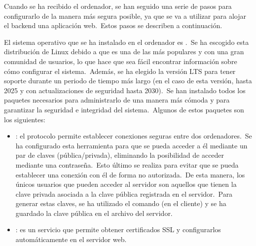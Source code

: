 Cuando se ha recibido el ordenador, se han seguido una serie de pasos para configurarlo de la manera más segura posible,
ya que se va a utilizar para alojar el backend una aplicación web.\ Estos pasos se describen a continuación.

El sistema operativo que se ha instalado en el ordenador es .\ Se ha escogido esta
distribución de Linux debido a que es una de las más populares y con una gran comunidad de usuarios, lo que
hace que sea fácil encontrar información sobre cómo configurar el sistema.\ Además, se ha elegido la versión LTS para
tener soporte durante un periodo de tiempo más largo (en el caso de esta versión, hasta 2025 y con actualizaciones de
seguridad hasta 2030).\ Se han instalado todos los paquetes necesarios para administrarlo de una manera más cómoda
y para garantizar la seguridad e integridad del sistema.\ Algunos de estos paquetes son los siguientes:
\begin{itemize}
	\item {}: el protocolo  permite establecer conexiones seguras entre dos
	ordenadores.\ Se ha configurado esta herramienta para que se pueda acceder a él mediante un par de claves
	(pública/privada), eliminando la posibilidad de acceder mediante una contraseña.\ Esto último se realiza para
	evitar que se pueda establecer una conexión con él de forma no autorizada.\ De esta manera, los únicos usuarios
	que pueden acceder al servidor son aquellos que tienen la clave privada asociada a la clave pública registrada en
	el servidor.\ Para generar estas claves, se ha utilizado el comando  (en el cliente) y se ha
	guardado la clave pública en el archivo  del servidor.

	\item {}: es un servicio que permite obtener certificados SSL y configurarlos automáticamente en el
	servidor web.
\end{itemize}
\label{itm:os_packages}


